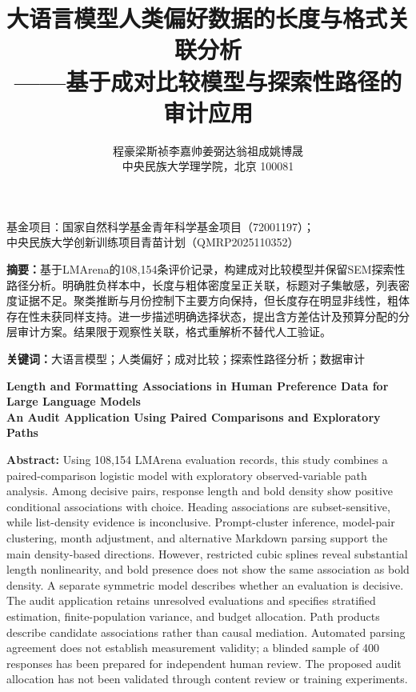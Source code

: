 \documentclass[UTF8,11pt,a4paper,fontset=windows]{ctexart}
\title{大语言模型人类偏好数据的长度与格式关联分析\\[0.3em]
\large ——基于成对比较模型与探索性路径的审计应用}
\author{程豪\quad 梁斯祯\quad 李嘉帅\quad 姜弼达\quad 翁祖成\quad 姚博晟\\
\small 中央民族大学理学院，北京 100081}
\date{}
\numberwithin{equation}{section}
\begin{document}
\maketitle
\thispagestyle{plain}
\begin{center}\small
基金项目：国家自然科学基金青年科学基金项目（72001197）；\\
中央民族大学创新训练项目青苗计划（QMRP2025110352）
\end{center}

\noindent\textbf{摘要：}基于LMArena的108,154条评价记录，构建成对比较模型并保留SEM探索性路径分析。明确胜负样本中，长度与粗体密度呈正关联，标题对子集敏感，列表密度证据不足。聚类推断与月份控制下主要方向保持，但长度存在明显非线性，粗体存在性未获同样支持。进一步描述明确选择状态，提出含方差估计及预算分配的分层审计方案。结果限于观察性关联，格式重解析不替代人工验证。

\noindent\textbf{关键词：}大语言模型；人类偏好；成对比较；探索性路径分析；数据审计

\begin{center}
\large\bfseries Length and Formatting Associations in Human Preference Data for Large Language Models\\[0.3em]
\normalsize An Audit Application Using Paired Comparisons and Exploratory Paths
\end{center}
\noindent\textbf{Abstract:} Using 108,154 LMArena evaluation records, this study combines a paired-comparison logistic model with exploratory observed-variable path analysis. Among decisive pairs, response length and bold density show positive conditional associations with choice. Heading associations are subset-sensitive, while list-density evidence is inconclusive. Prompt-cluster inference, model-pair clustering, month adjustment, and alternative Markdown parsing support the main density-based directions. However, restricted cubic splines reveal substantial length nonlinearity, and bold presence does not show the same association as bold density. A separate symmetric model describes whether an evaluation is decisive. The audit application retains unresolved evaluations and specifies stratified estimation, finite-population variance, and budget allocation. Path products describe candidate associations rather than causal mediation. Automated parsing agreement does not establish measurement validity; a blinded sample of 400 responses has been prepared for independent human review. The proposed audit allocation has not been validated through content review or training experiments.
\end{document}
